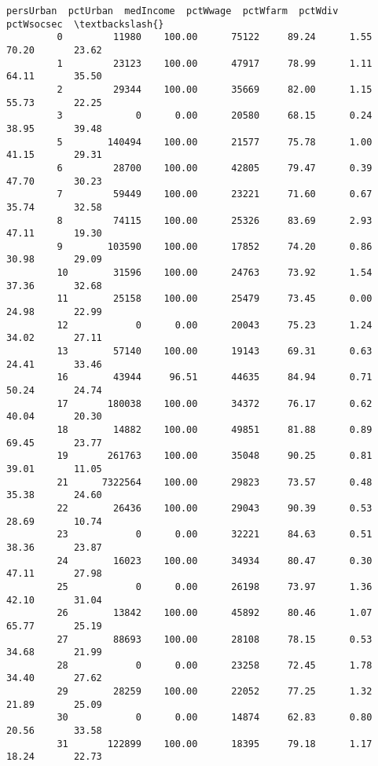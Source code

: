 \documentclass[11pt]{llncs}
\begin{document}
\begin{Verbatim}[commandchars=\\\{\}]
               persUrban  pctUrban  medIncome  pctWwage  pctWfarm  pctWdiv  pctWsocsec  \textbackslash{}
         0         11980    100.00      75122     89.24      1.55    70.20       23.62   
         1         23123    100.00      47917     78.99      1.11    64.11       35.50   
         2         29344    100.00      35669     82.00      1.15    55.73       22.25   
         3             0      0.00      20580     68.15      0.24    38.95       39.48   
         5        140494    100.00      21577     75.78      1.00    41.15       29.31   
         6         28700    100.00      42805     79.47      0.39    47.70       30.23   
         7         59449    100.00      23221     71.60      0.67    35.74       32.58   
         8         74115    100.00      25326     83.69      2.93    47.11       19.30   
         9        103590    100.00      17852     74.20      0.86    30.98       29.09   
         10        31596    100.00      24763     73.92      1.54    37.36       32.68   
         11        25158    100.00      25479     73.45      0.00    24.98       22.99   
         12            0      0.00      20043     75.23      1.24    34.02       27.11   
         13        57140    100.00      19143     69.31      0.63    24.41       33.46   
         16        43944     96.51      44635     84.94      0.71    50.24       24.74   
         17       180038    100.00      34372     76.17      0.62    40.04       20.30   
         18        14882    100.00      49851     81.88      0.89    69.45       23.77   
         19       261763    100.00      35048     90.25      0.81    39.01       11.05   
         21      7322564    100.00      29823     73.57      0.48    35.38       24.60   
         22        26436    100.00      29043     90.39      0.53    28.69       10.74   
         23            0      0.00      32221     84.63      0.51    38.36       23.87   
         24        16023    100.00      34934     80.47      0.30    47.11       27.98   
         25            0      0.00      26198     73.97      1.36    42.10       31.04   
         26        13842    100.00      45892     80.46      1.07    65.77       25.19   
         27        88693    100.00      28108     78.15      0.53    34.68       21.99   
         28            0      0.00      23258     72.45      1.78    34.40       27.62   
         29        28259    100.00      22052     77.25      1.32    21.89       25.09   
         30            0      0.00      14874     62.83      0.80    20.56       33.58   
         31       122899    100.00      18395     79.18      1.17    18.24       22.73   

\end{Verbatim}
\end{document}
